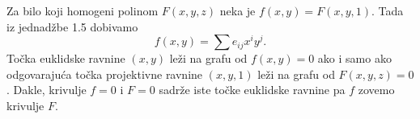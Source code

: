  \label{Sec:1}
%

Za bilo koji homogeni polinom $F(x,y,z)$ neka je $f(x,y)=F(x,y,1)$. Tada iz
jednad\v{z}be 1.5 dobivamo
$$f(x,y)=\sum e_{ij} x^i y^j \mathrm{.}$$
To\v{c}ka euklidske ravnine $(x,y)$ le\v{z}i na grafu od $f(x,y)=0$ ako i samo ako odgovaraju\'{c}a
to\v{c}ka projektivne ravnine $(x,y,1)$ le\v{z}i na grafu od $F(x,y,z)=0$. Dakle, krivulje
$f=0$ i $F=0$ sadr\v{z}e iste to\v{c}ke euklidske ravnine pa $f$ zovemo 
krivulje $F$.
